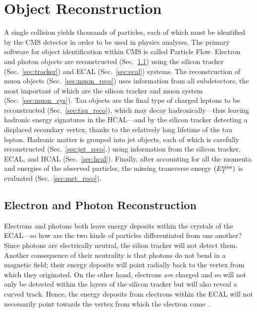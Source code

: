 \section{Object Reconstruction}
\label{sec:obj_reco}
A single \pp collision yields thousands of particles, each of which must be identified by the CMS detector in order to be used in physics analyses.
The primary software for object identification within CMS is called Particle Flow. %
Electron and photon objects are reconstructed (Sec.~\ref{sec:egamma_reco}) using the silicon tracker (Sec.~\ref{sec:tracker}) and ECAL (Sec.~\ref{sec:ecal}) systems.
The reconstruction of muon objects (Sec.~\ref{sec:muon_reco}) uses information from all subdetectors, the most important of which are the silicon tracker and muon system (Sec.~\ref{sec:muon_sys}).
Tau objects are the final type of charged leptons to be reconstructed (Sec.~\ref{sec:tau_reco}), which may decay hadronically---thus leaving hadronic energy signatures in the HCAL---and by the silicon tracker detecting a displaced secondary vertex, thanks to the relatively long lifetime of the tau lepton.  %
Hadronic matter is grouped into jet objects, each of which is carefully reconstructed (Sec.~\ref{sec:jet_reco}.) using information from the silicon tracker, ECAL, and HCAL (Sec.~\ref{sec:hcal}).
Finally, after accounting for all the momenta and energies of the observed particles, the missing transverse energy $\left( E_{\mathrm{T}}^{\text{miss}} \right)$ is evaluated (Sec.~\ref{sec:met_reco}).


\subsection{Electron and Photon Reconstruction}
\label{sec:egamma_reco}
Electrons and photons both leave energy deposits within the crystals of the ECAL---so how are the two kinds of particles differentiated from one another?
Since photons are electrically neutral, the silion tracker will not detect them.
Another consequence of their neutrality is that photons do not bend in a magnetic field;
their energy deposits will point radially back to the vertex from which they originated.
On the other hand, electrons \emph{are} charged and so will not only be detected within the layers of the silicon tracker but will also reveal a curved track.
Hence, the energy deposits from electrons within the ECAL will not necessarily point towards the vertex from which the electron came~\cite{Ereco_performance_2015}.

